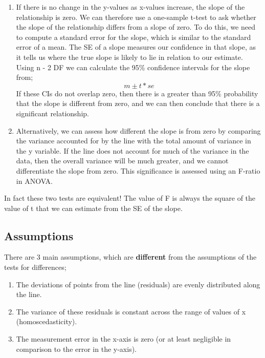 \documentclass[
]{book}
\providecommand{\tightlist}{%
  \setlength{\itemsep}{0pt}\setlength{\parskip}{0pt}}
\begin{document}
\begin{enumerate}
\def\labelenumi{\arabic{enumi})}
\item
  If there is no change in the y-values as x-values increase, the slope of the relationship is zero. We can therefore use a one-sample t-test to ask whether the slope of the relationship differs from a slope of zero. To do this, we need to compute a standard error for the slope, which is similar to the standard error of a mean. The SE of a slope measures our confidence in that slope, as it tells us where the true slope is likely to lie in relation to our estimate. Using n - 2 DF we can calculate the 95\% confidence intervals for the slope from;
  \[
  m ± t*se 
  \]
  If these CIs do not overlap zero, then there is a greater than 95\% probability that the slope is different from zero, and we can then conclude that there is a significant relationship.
\item
  Alternatively, we can assess how different the slope is from zero by comparing the variance accounted for by the line with the total amount of variance in the y variable. If the line does not account for much of the variance in the data, then the overall variance will be much greater, and we cannot differentiate the slope from zero. This significance is assessed using an F-ratio in ANOVA.
\end{enumerate}

In fact these two tests are equivalent! The value of F is always the square of the value of t that we can estimate from the SE of the slope.

\subsection*{Assumptions}\label{assumptions}

There are 3 main assumptions, which are \textbf{different} from the assumptions of the tests for differences;

\begin{enumerate}
\def\labelenumi{\arabic{enumi})}
\tightlist
\item
  The deviations of points from the line (residuals) are evenly distributed along the line.
\item
  The variance of these residuals is constant across the range of values of x (homoscedasticity).
\item
  The measurement error in the x-axis is zero (or at least negligible in comparison to the error in the y-axis).
\end{enumerate}
\end{document}
